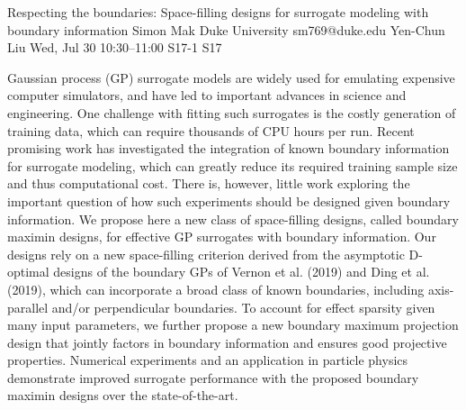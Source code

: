 \begin{talk}
  {Respecting the boundaries: Space-filling designs for surrogate modeling with boundary information}%
  {Simon Mak}%
  {Duke University}%
  {sm769@duke.edu}%
  {Yen-Chun Liu}%
  {}%
  {Wed, Jul 30 10:30–11:00}%
  {S17-1}%
  {S17}%
  
				
			
Gaussian process (GP) surrogate models are widely used for emulating expensive computer simulators, and have led to important advances in science and engineering. One challenge with fitting such surrogates is the costly generation of training data, which can require thousands of CPU hours per run. Recent promising work has investigated the integration of known boundary information for surrogate modeling, which can greatly reduce its required training sample size and thus computational cost. There is, however, little work exploring the important question of how such experiments should be designed given boundary information. We propose here a new class of space-filling designs, called boundary maximin designs, for effective GP surrogates with boundary information. Our designs rely on a new space-filling criterion derived from the asymptotic D-optimal designs of the boundary GPs of Vernon et al. (2019) and Ding et al. (2019), which can incorporate a broad class of known boundaries, including axis-parallel and/or perpendicular boundaries. To account for effect sparsity given many input parameters, we further propose a new boundary maximum projection design that jointly factors in boundary information and ensures good projective properties. Numerical experiments and an application in particle physics demonstrate improved surrogate performance with the proposed boundary maximin designs over the state-of-the-art.
\medskip


\end{talk}


